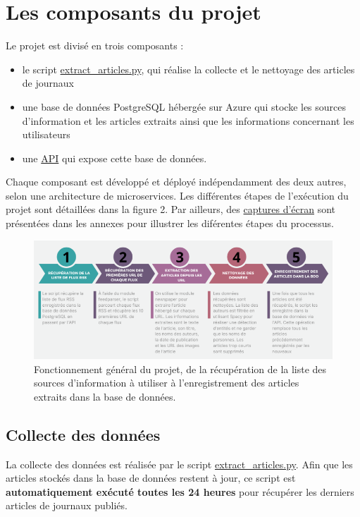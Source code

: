 \documentclass[french]{article}
\begin{document}
    \section{Les composants du projet}
    Le projet est divisé en trois composants : 
    \begin{itemize}
        \item le script \href{https://github.com/vinpap/your_news_anchor/blob/main/extract_articles.py}{extract\_articles.py}, qui réalise la collecte et le nettoyage des articles de journaux
        \item une base de données PostgreSQL hébergée sur Azure qui stocke les sources d'information et les articles extraits ainsi que les informations concernant les utilisateurs
        \item une \href{https://github.com/vinpap/your_news_anchor_db_api}{API} qui expose cette base de données.
    \end{itemize}
    Chaque composant est développé et déployé indépendamment des deux autres, selon une architecture de microservices. Les différentes étapes de l'exécution du projet sont détaillées dans la figure 2. Par ailleurs, des \hyperlink{screenshots_processus}{captures d'écran} sont présentées dans les annexes pour illustrer les diférentes étapes du processus.
    \begin{figure}[h]
        \includegraphics[width=15cm]{fonctionnement_script}
        \centering
        \caption{Fonctionnement général du projet, de la récupération de la liste des sources d'information à utiliser à l'enregistrement des articles extraits dans la base de données.}
        \centering
    \end{figure}
    
    \subsection{Collecte des données}

    La collecte des données est réalisée par le script \href{https://github.com/vinpap/your_news_anchor/blob/main/extract_articles.py}{extract\_articles.py}. Afin que les articles stockés dans la base de données restent à jour, ce script est \textbf{automatiquement exécuté toutes les 24 heures} pour récupérer les derniers articles de journaux publiés.
    
\end{document}
